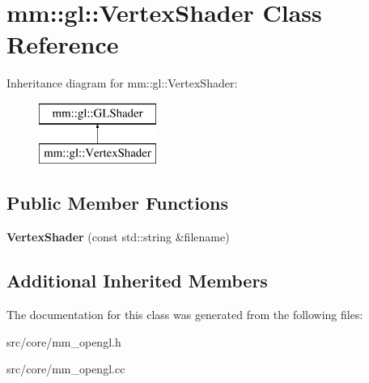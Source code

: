 \hypertarget{classmm_1_1gl_1_1_vertex_shader}{}\section{mm\+:\+:gl\+:\+:Vertex\+Shader Class Reference}
\label{classmm_1_1gl_1_1_vertex_shader}
Inheritance diagram for mm\+:\+:gl\+:\+:Vertex\+Shader\+:\begin{figure}[H]
\begin{center}
\leavevmode
\includegraphics[height=2.000000cm]{classmm_1_1gl_1_1_vertex_shader}
\end{center}
\end{figure}
\subsection*{Public Member Functions}
\begin{DoxyCompactItemize}
\item 
\hypertarget{classmm_1_1gl_1_1_vertex_shader_a0b5794e93625ce7729811cf54d4f0243}{}{\bfseries Vertex\+Shader} (const std\+::string \&filename)\label{classmm_1_1gl_1_1_vertex_shader_a0b5794e93625ce7729811cf54d4f0243}

\end{DoxyCompactItemize}
\subsection*{Additional Inherited Members}


The documentation for this class was generated from the following files\+:\begin{DoxyCompactItemize}
\item 
src/core/mm\+\_\+opengl.\+h\item 
src/core/mm\+\_\+opengl.\+cc\end{DoxyCompactItemize}
